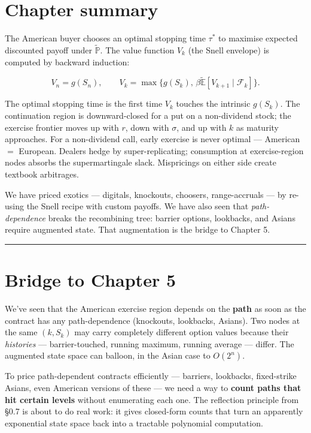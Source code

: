 \documentclass[
  10pt,
  twoside]{book}
\begin{document}
\section{Chapter summary}\label{chapter-summary-1}

The American buyer chooses an optimal stopping time \(\tau^*\) to
maximise expected discounted payoff under \(\tilde{\mathbb{P}}\). The
value function \(V_k\) (the Snell envelope) is computed by backward
induction:

\[V_n = g(S_n), \qquad V_k = \max\{g(S_k),\, \beta\tilde{\mathbb{E}}[V_{k+1}\mid\mathcal F_k]\}.\]

The optimal stopping time is the first time \(V_k\) touches the
intrinsic \(g(S_k)\). The continuation region is downward-closed for a
put on a non-dividend stock; the exercise frontier moves up with \(r\),
down with \(\sigma\), and up with \(k\) as maturity approaches. For a
non-dividend call, early exercise is never optimal --- American \(=\)
European. Dealers hedge by super-replicating; consumption at
exercise-region nodes absorbs the supermartingale slack. Mispricings on
either side create textbook arbitrages.

We have priced exotics --- digitals, knockouts, choosers, range-accruals
--- by re-using the Snell recipe with custom payoffs. We have also seen
that \emph{path-dependence} breaks the recombining tree: barrier
options, lookbacks, and Asians require augmented state. That
augmentation is the bridge to Chapter 5.

\begin{center}\rule{0.5\linewidth}{0.5pt}\end{center}

\section{Bridge to Chapter 5}\label{bridge-to-chapter-5}

We've seen that the American exercise region depends on the
\textbf{path} as soon as the contract has any path-dependence
(knockouts, lookbacks, Asians). Two nodes at the same \((k, S_k)\) may
carry completely different option values because their \emph{histories}
--- barrier-touched, running maximum, running average --- differ. The
augmented state space can balloon, in the Asian case to \(O(2^n)\).

To price path-dependent contracts efficiently --- barriers, lookbacks,
fixed-strike Asians, even American versions of these --- we need a way
to \textbf{count paths that hit certain levels} without enumerating each
one. The reflection principle from §0.7 is about to do real work: it
gives closed-form counts that turn an apparently exponential state space
back into a tractable polynomial computation.
\end{document}
